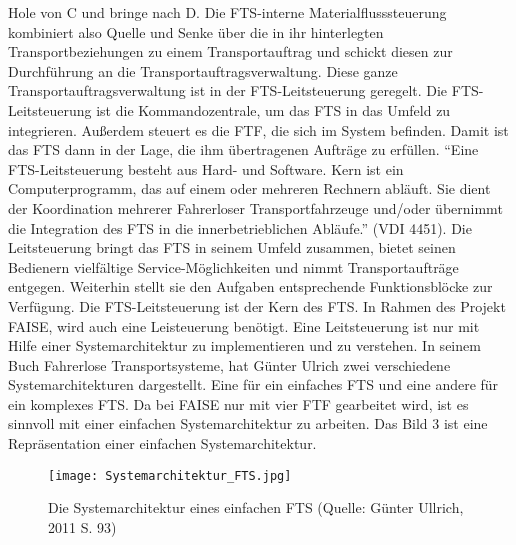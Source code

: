 \begin{itemize}
Hole von C und bringe nach D.
Die FTS-interne Materialflusssteuerung kombiniert also Quelle und Senke \"uber die in ihr hinterlegten Transportbeziehungen zu einem Transportauftrag und schickt diesen zur Durchf\"uhrung an die Transportauftragsverwaltung.
Diese ganze Transportauftragsverwaltung ist in der FTS-Leitsteuerung geregelt. 
Die FTS-Leitsteuerung ist die Kommandozentrale, um das FTS in das Umfeld zu integrieren.
Au\ss erdem steuert es die FTF, die sich im System befinden.
Damit ist das FTS dann in der Lage, die ihm \"ubertragenen Auftr\"age zu erf\"ullen.
"`Eine FTS-Leitsteuerung besteht aus Hard- und Software.
Kern ist ein Computerprogramm, das auf einem oder mehreren Rechnern abl\"auft.
Sie dient der Koordination mehrerer Fahrerloser Transportfahrzeuge und/oder \"ubernimmt die Integration des FTS in die innerbetrieblichen Abl\"aufe."' (VDI 4451).
Die Leitsteuerung bringt das FTS in seinem Umfeld zusammen, bietet seinen Bedienern vielf\"altige Service-M\"oglichkeiten und nimmt Transportauftr\"age entgegen.
Weiterhin stellt sie den Aufgaben entsprechende Funktionsbl\"ocke zur Verf\"ugung. 
Die FTS-Leitsteuerung ist der Kern des FTS.
In Rahmen des Projekt FAISE, wird auch eine Leisteuerung ben\"otigt.
Eine Leitsteuerung ist nur mit Hilfe einer Systemarchitektur zu implementieren und zu verstehen.
In seinem Buch Fahrerlose Transportsysteme, hat G\"unter Ulrich zwei verschiedene Systemarchitekturen dargestellt.
Eine f\"ur ein einfaches FTS und eine andere f\"ur ein komplexes FTS.
Da bei FAISE nur mit vier FTF gearbeitet wird, ist es sinnvoll mit einer einfachen Systemarchitektur zu arbeiten.
Das Bild 3 ist eine Repr\"asentation einer einfachen Systemarchitektur.
	\begin{figure}[h!]
		\centering
		\texttt{[image: Systemarchitektur\_FTS.jpg]}
		\caption{Die Systemarchitektur eines einfachen FTS (Quelle: G\"unter Ullrich, 2011 S. 93)}
		\label{Systemarchitektur_FTS}
	\end{figure}


\end{itemize}
